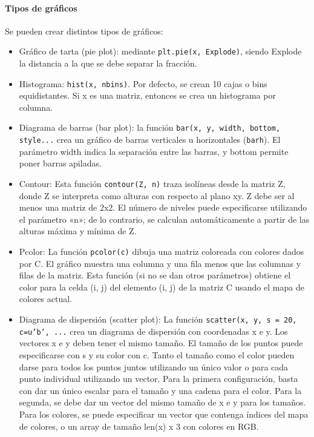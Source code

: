 \paragraph{Tipos de gráficos}
Se pueden crear distintos tipos de gráficos:
\begin{itemize}
\item Gráfico de tarta (pie plot): mediante \texttt{plt.pie(x, Explode)}, siendo Explode la distancia a la que se debe separar la fracción.
\item Histograma: \texttt{hist(x, nbins)}. Por defecto, se crean 10 cajas o bins equidistantes. Si x es una matriz, entonces se crea un histograma por columna.
\item Diagrama de barras (bar plot): la función \texttt{bar(x, y, width, bottom, style...} crea un gráfico de barras verticales u horizontales (\texttt{barh}). El parámetro width indica la separación entre las barras, y bottom permite poner barras apiladas.
\item Contour: Esta función \texttt{contour(Z, n)} traza isolíneas desde la matriz Z, donde Z se interpreta como alturas con respecto al plano xy. Z debe ser al menos una matriz de 2x2. El número de niveles puede especificarse utilizando el parámetro «n»; de lo contrario, se calculan automáticamente a partir de las alturas máxima y mínima de Z.
\item Pcolor: La función \texttt{pcolor(c)} dibuja una matriz coloreada con colores dados por C. El gráfico muestra una columna y una fila menos que las columnas y filas de la matriz. Esta función (si no se dan otros parámetros) obtiene el color para la celda (i, j) del elemento (i, j) de la matriz C usando el mapa de colores actual.
\item Diagrama de dispersión (scatter plot): La función \texttt{scatter(x, y, s = 20, c=u'b', ...} crea un diagrama de dispersión con coordenadas x e y. Los vectores x e y deben tener el mismo tamaño. El tamaño de los puntos puede especificarse con s y su color con c. Tanto el tamaño como el color pueden darse para todos los puntos juntos utilizando un único valor o para cada punto individual utilizando un vector. Para la primera configuración, basta con dar un único escalar para el tamaño y una cadena para el color. Para la segunda, se debe dar un vector del mismo tamaño de x e y para los tamaños. Para los colores, se puede especificar un vector que contenga índices del mapa de colores, o un array de tamaño len(x) x 3 con colores en RGB.
\end{itemize}


